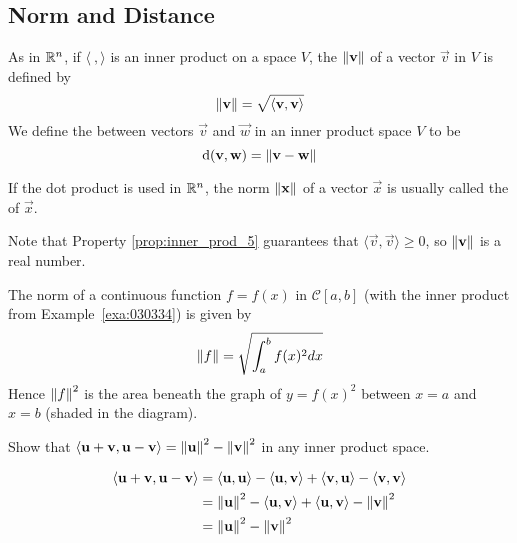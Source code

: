 \documentclass{ximera}
\begin{document}
\subsection*{Norm and Distance}

\begin{definition}\label{def:030438}
As in $\mathbb{R}^n$, if $\langle\ , \rangle$ is an inner product on a space $V$, the 
 $\left\lVert\mathbf{v}\right\rVert$ of a vector $\vec{v}$ in $V$ is defined by
\begin{equation*}
\left\lVert \mathbf{v} \right\rVert = \sqrt{\langle \mathbf{v}, \mathbf{v} \rangle}
\end{equation*}
We define the  between vectors $\vec{v}$ and $\vec{w}$ in an inner product space $V$ to be
\begin{equation*}
\mbox{d}(\mathbf{v}, \mathbf{w}) = \left\lVert \mathbf{v} - \mathbf{w} \right\rVert
\end{equation*}
\end{definition}
\begin{remark}
 If the dot product is used in $\mathbb{R}^n$, the norm $\left\lVert\mathbf{x}\right\rVert$ of a vector $\vec{x}$ is usually called the  of $\vec{x}$.   
\end{remark}


Note that  Property \ref{prop:inner_prod_5} guarantees that
$\langle\vec{v}, \vec{v}\rangle \geq 0$, so $\left\lVert\mathbf{v}\right\rVert$ is a real number.

\begin{example}\label{exa:030446}

The norm of a continuous function $f = f(x)$ in $\mathcal{C}[a, b]$ (with the inner product from Example~\ref{exa:030334}) is given by
\begin{equation*}
\left\lVert f \right\rVert = \sqrt{\int_{a}^{b} f(x)^2dx}
\end{equation*}
Hence $\left\lVert f\right\rVert^{2}$ is the area beneath the graph of $y = f(x)^{2}$ between $x = a$ and $x = b$ (shaded in the diagram).
\end{example}

\begin{example}\label{030454}
Show that $\langle\mathbf{u} + \mathbf{v}, \mathbf{u} - \mathbf{v}\rangle = \left\lVert\mathbf{u}\right\rVert^{2} - \left\lVert\mathbf{v}\right\rVert^{2}$ in any inner product space.

\begin{explanation}
\begin{align*}
\langle \mathbf{u} + \mathbf{v}, \mathbf{u} - \mathbf{v} \rangle &= \langle \mathbf{u}, \mathbf{u} \rangle - \langle \mathbf{u}, \mathbf{v} \rangle + \langle \mathbf{v}, \mathbf{u} \rangle - \langle \mathbf{v}, \mathbf{v} \rangle \\
&= \left\lVert \mathbf{u} \right\rVert^2 - \langle \mathbf{u}, \mathbf{v} \rangle + \langle \mathbf{u}, \mathbf{v} \rangle - \left\lVert \mathbf{v} \right\rVert^2 \\
&= \left\lVert \mathbf{u} \right\rVert^2 - \left\lVert \mathbf{v} \right\rVert^2
\end{align*}
\end{explanation}
\end{example}
\end{document}
